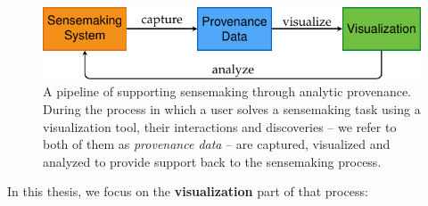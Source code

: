 
\begin{figure}[ht]
	\centering
	\includegraphics[width=.8\linewidth]{workflow}
	\caption{A pipeline of supporting sensemaking through analytic provenance. During the process in which a user solves a sensemaking task using a visualization tool, their interactions and discoveries -- we refer to both of them as \emph{provenance data} -- are captured, visualized and analyzed to provide support back to the sensemaking process.}
	\label{fig:workflow}
\end{figure}

In this thesis, we focus on the \textbf{visualization} part of that process:
\begin{center}
\end{center}

